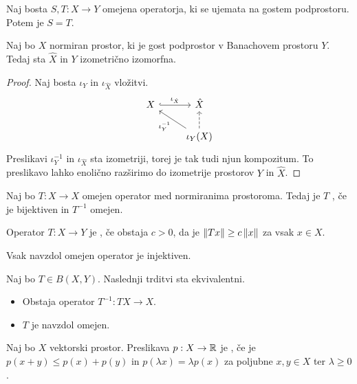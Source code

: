 \begin{posledica}
  Naj bosta $S, T: X \to Y$ omejena operatorja, ki se ujemata na gostem
  podprostoru.
  Potem je $S = T$.
\end{posledica}

\begin{posledica}
  Naj bo $X$ normiran prostor, ki je gost podprostor v Banachovem prostoru $Y$.
  Tedaj sta $\hat{X}$ in $Y$ izometrično izomorfna.
\end{posledica}

\begin{proof}
  Naj bosta $\iota_Y$ in $\iota_{\hat{X}}$ vložitvi.
  \[\begin{tikzcd}
	  X & {\hat{X}} \\
	  & {\iota_Y(X)}
	  \arrow["{\iota_{\hat{X}}}", hook, from=1-1, to=1-2]
	  \arrow["{\iota_Y^{-1}}", from=2-2, to=1-1]
	  \arrow[dashed, from=2-2, to=1-2]
	\end{tikzcd}\]
  Preslikavi $\iota_Y^{-1}$ in $\iota_{\hat{X}}$ sta izometriji, torej je tak
  tudi njun kompozitum.
  To preslikavo lahko enolično razširimo do izometrije prostorov $Y$ in
  $\hat{X}$.
\end{proof}

\begin{definicija}
  Naj bo $T: X \to X$ omejen operator med normiranima prostoroma.
  Tedaj je $T$ , če je bijektiven in $T^{-1}$ omejen.
\end{definicija}

\begin{definicija}
  Operator $T:X \to Y$ je , če obstaja $c > 0$, da je
  $\left\lVert Tx\right\rVert \ge c \left\lVert x\right\rVert$ za vsak $x \in X$.
\end{definicija}

\begin{opomba}
  Vsak navzdol omejen operator je injektiven.
\end{opomba}

\begin{trditev}
  Naj bo $T \in B(X,Y)$.
  Naslednji trditvi sta ekvivalentni.
  \begin{itemize}
  \item Obstaja operator $T^{-1}: TX \to X$.
  \item $T$ je navzdol omejen.
  \end{itemize}
\end{trditev}


\begin{definicija}
  Naj bo $X$ vektorski prostor.
  Preslikava $p: X \to \mathbb{R}$ je , če je $p(x+y) \le
  p(x) + p(y)$ in $p(\lambda x) = \lambda p(x)$ za poljubne $x, y \in X$ ter
  $\lambda \ge 0$.
\end{definicija}

